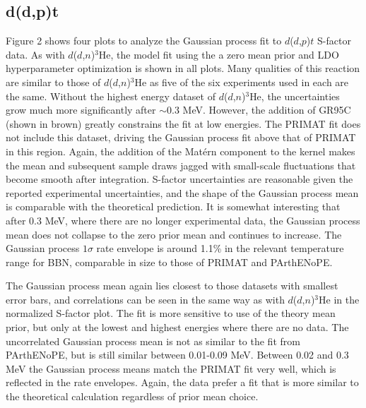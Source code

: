 \documentclass[%
 reprint,
superscriptaddress,
nofootinbib,
 amsmath,amssymb,
 aps,
 pra,
]{revtex4-2}
\begin{document}
\subsection{d(d,p)t}

Figure 2 shows four plots to analyze the Gaussian process fit to $d$($d$,$p$)$t$ S-factor data. As with $d$($d$,$n$)$^3$He, the model fit using the a zero mean prior and LDO hyperparameter optimization is shown in all plots. Many qualities of this reaction are similar to those of $d$($d$,$n$)$^3$He as five of the six experiments used in each are the same. Without the highest energy dataset of $d$($d$,$n$)$^3$He, the uncertainties grow much more significantly after $\sim0.3$ MeV. However, the addition of GR95C (shown in brown) greatly constrains the fit at low energies. The PRIMAT fit does not include this dataset, driving the Gaussian process fit above that of PRIMAT in this region. Again, the addition of the Mat\'ern component to the kernel makes the mean and subsequent sample draws jagged with small-scale fluctuations that become smooth after integration. S-factor uncertainties are reasonable given the reported experimental uncertainties, and the shape of the Gaussian process mean is comparable with the theoretical prediction. It is somewhat interesting that after 0.3 MeV, where there are no longer experimental data, the Gaussian process mean does not collapse to the zero prior mean and continues to increase. The Gaussian process $1\sigma$ rate envelope is around 1.1\% in the relevant temperature range for BBN, comparable in size to those of PRIMAT and PArthENoPE.

The Gaussian process mean again lies closest to those datasets with smallest error bars, and correlations can be seen in the same way as with $d$($d$,$n$)$^3$He in the normalized S-factor plot. The fit is more sensitive to use of the theory mean prior, but only at the lowest and highest energies where there are no data. The uncorrelated Gaussian process mean is not as similar to the fit from PArthENoPE, but is still similar between 0.01-0.09 MeV. Between 0.02 and 0.3 MeV the Gaussian process means match the PRIMAT fit very well, which is reflected in the rate envelopes. Again, the data prefer a fit that is more similar to the theoretical calculation regardless of prior mean choice.
\end{document}
